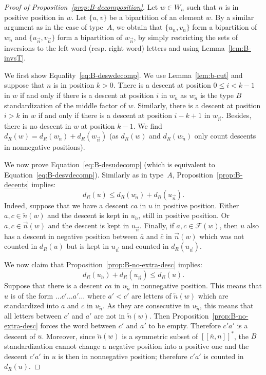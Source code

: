 \documentclass[Unicode]{cedram-alco}
\theoremstyle{definition}
\newcommand{\R}{{\overrightarrow{n}}}
\newcommand{\LL}{{\overleftarrow{n}}}
\newcommand{\dd}{d_R}
\newcommand{\Bsetnn}{[\![\bar{n},n ]\!]^*}
\newcommand{\F}{\mathcal{F}}
\begin{document}
\begin{proof}[Proof of Proposition~\ref{prop:B-decomposition}]
Let $w\in W_n$ such that $n$ is in positive position in $w$. Let $\lbrace u, v \rbrace$ be a bipartition of an element $w$. By a similar argument as in the case of type~$A$, we obtain that $\lbrace u_\LL, v_\LL \rbrace$ form a bipartition of $w_\LL$ and $\lbrace u_\R, v_\R \rbrace$ form a bipartition of $w_\R$, by simply restricting the sets of inversions to the left word (resp. right word) letters and using Lemma~\ref{lem:B-invsT}.

We first show Equality~\eqref{eq:B-deswdecomp}. We use Lemma~\ref{lem:b-cut} and suppose that $n$ is in position $k > 0$. There is a descent at position $ 0 \leq i < k - 1$ in $w$ if and only if there is a descent at position $i$ in $w_\LL$ as $w_\LL$ is the type $B$ standardization of the middle factor of $w$. Similarly, there is a descent at position $i > k$ in $w$ if and only if there is a descent at position $i-k+1$ in $w_\R$. Besides, there is no descent in $w$ at position $k-1$. We find $\dd(w) = \dd(w_\LL) + \dd(w_\R)$ (as $\dd(w)$ and $\dd(w_\LL)$ only count descents in nonnegative positions).

We now prove Equation~\eqref{eq:B-desudecomp} (which is equivalent to Equation~\eqref{eq:B-desvdecomp}). Similarly as in type~$A$, Proposition~\ref{prop:B-decents} implies:
\begin{equation*}
\dd(u) \leq \dd(u_\LL) + \dd(u_\R).
\end{equation*} 
Indeed, suppose that we have a descent $ca$ in $u$ in positive position. Either $a,c \in \LL(w)$ and the descent is kept in $u_\LL$, still in positive position. Or $a,c \in \R(w)$ and the descent is kept in $u_\R$. Finally, if $a,c \in \F(w)$, then $u$ also has a descent in negative position between $\bar a$ and $\bar c$ in $\R(w)$ which was not counted in $\dd(u)$ but is kept in $u_\R$ and counted in $\dd(u_\R)$. 

We now claim that Proposition~\ref{prop:B-no-extra-desc} implies:
\begin{equation*}
\dd(u_\LL) + \dd(u_\R) \leq \dd(u).
\end{equation*} 
Suppose that there is a descent $ca$ in $u_\LL$ in nonnegative position. This means that $u$ is of the form $\dots c' \dots a' \dots$ where $a' < c'$ are letters of $\LL(w)$ which are standardized into $a$ and $c$ in $u_\LL$. As they are consecutive in $u_\LL$, this means that all letters between $c'$ and $a'$ are not in $\LL(w)$. Then Proposition~\ref{prop:B-no-extra-desc} forces the word between $c'$ and $a'$ to be empty. Therefore $c'a'$ is a descent of $u$. 
Moreover, since $\LL(w)$ is a symmetric subset of $\Bsetnn$, the $B$ standardization cannot change a negative position into a positive one and the descent $c'a'$ in $u$ is then in nonnegative position; therefore $c'a'$ is counted in $\dd(u)$. 


\end{proof}
\end{document}
